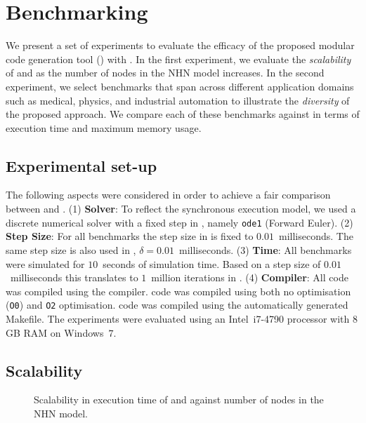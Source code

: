 \section{Benchmarking}
\label{sec:benchmarking}


We present a set of experiments to evaluate the efficacy of the proposed
modular code generation tool (\ourTool) with \simulink.  In the first 
experiment, we evaluate the \emph{scalability} of \ourTool and \simulink as the 
number of nodes in the \ac{NHN} model increases.  In the second experiment, we 
select benchmarks that span across different application domains such as 
medical, physics, and industrial automation to illustrate the \emph{diversity} 
of the proposed approach.  We compare each of these benchmarks against 
\simulink in terms of execution time and maximum memory usage.  


\subsection{Experimental set-up}
\label{sec:experimentalSetUp}
The following aspects were considered in order to achieve a fair
comparison between \ourTool and \simulink. 
(1) \textbf{Solver}: To reflect the synchronous execution model, we
  used a discrete numerical solver with a fixed step in \simulink,
  namely \texttt{ode1} (Forward Euler).
(2) 
\textbf{Step Size}: For all benchmarks the step size in \simulink
  is fixed to $0.01$~milliseconds.  The same step size is also used in
  \ourTool, $\delta = 0.01$~milliseconds.
(3) 
\textbf{Time}: All benchmarks were simulated for $10$~seconds of
  simulation time.  Based on a step size of $0.01$~milliseconds this
  translates to $1$~million iterations in \ourTool.
  (4)
\textbf{Compiler}: All code was compiled using the \compiler
  compiler.  \ourTool code was compiled using both no optimisation
  (\texttt{O0}) and \texttt{O2} optimisation.  \simulink code was
  compiled using the automatically generated Makefile.
The experiments were evaluated using an Intel~i7-4790 processor with
$8$\,GB RAM on Windows~$7$.


\subsection{Scalability}

\begin{figure}[htbp]
  \centering
  
  \caption{Scalability in  execution time of \simulink and \ourTool against 
  number of nodes in the \acf{NHN} model.}
  \label{fig:scalability}
\end{figure}

